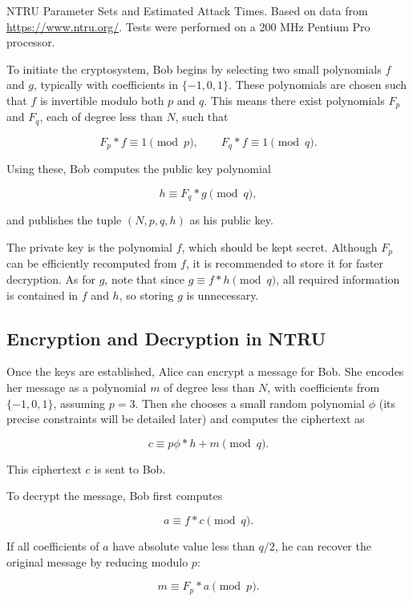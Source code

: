 \documentclass[a4paper,12pt]{article}
\begin{document}
NTRU Parameter Sets and Estimated Attack Times. Based on data from \url{https://www.ntru.org/}. Tests were performed on a 200 MHz Pentium Pro processor.


To initiate the cryptosystem, Bob begins by selecting two small polynomials \( f \) and \( g \), typically with coefficients in \(\{-1, 0, 1\}\). These polynomials are chosen such that \( f \) is invertible modulo both \( p \) and \( q \). This means there exist polynomials \( F_p \) and \( F_q \), each of degree less than \( N \), such that

\[
F_p * f \equiv 1 \pmod{p}, \qquad F_q * f \equiv 1 \pmod{q}.
\]

Using these, Bob computes the public key polynomial

\[
h \equiv F_q * g \pmod{q},
\]

and publishes the tuple \( (N, p, q, h) \) as his public key.

\medskip

The private key is the polynomial \( f \), which should be kept secret. Although \( F_p \) can be efficiently recomputed from \( f \), it is recommended to store it for faster decryption. As for \( g \), note that since \( g \equiv f * h \pmod{q} \), all required information is contained in \( f \) and \( h \), so storing \( g \) is unnecessary.


\subsection*{Encryption and Decryption in NTRU}

Once the keys are established, Alice can encrypt a message for Bob. She encodes her message as a polynomial \( m \) of degree less than \( N \), with coefficients from \( \{ -1, 0, 1 \} \), assuming \( p = 3 \). Then she chooses a small random polynomial \( \phi \) (its precise constraints will be detailed later) and computes the ciphertext as

\[
c \equiv p\phi * h + m \pmod{q}.
\]

This ciphertext \( c \) is sent to Bob.

\medskip

To decrypt the message, Bob first computes

\[
a \equiv f * c \pmod{q}.
\]

If all coefficients of \( a \) have absolute value less than \( q/2 \), he can recover the original message by reducing modulo \( p \):

\[
m \equiv F_p * a \pmod{p}.
\]
\end{document}

